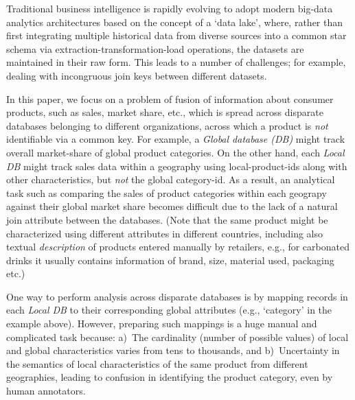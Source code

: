 Traditional business intelligence is rapidly evolving to adopt modern big-data analytics architectures based on the concept of a `data lake', where, rather than  first integrating multiple historical data from diverse sources into a common star schema via extraction-transformation-load operations, the datasets are maintained in their raw form. This leads to a number of challenges; for example, dealing with incongruous join keys between different datasets. 

In this paper, we focus on a problem of fusion of information about consumer products, such as sales, market share, etc., which is spread across disparate databases belonging to different organizations, across which a product is \textit{not} identifiable via a common key. For example, a \textit{Global database (DB)}
might track overall market-share of global product categories. On the other hand, each \textit{Local DB} might track sales data within a geography 
using local-product-ids along with other characteristics, but \textit{not} the global category-id. As a result, an analytical task such as comparing the
sales of product categories within each geograpy against their global market share becomes difficult due to the lack of a natural join attribute between the databases.
(Note that the same product might be characterized using different attributes in different countries, including also textual \textit{description} of products entered manually by retailers, e.g., for carbonated drinks it usually contains information of brand, size, material used, packaging etc.) 


One way to perform analysis across disparate databases is by mapping records in each \textit{Local DB} to their corresponding global attributes (e.g., `category'
in the example above). However, preparing such mappings is a huge manual and complicated task because: a)~The cardinality (number of possible values) of local and global characteristics varies from tens to thousands, and b)~Uncertainty in the semantics of local characteristics of the same product from different geographies, leading to confusion in identifying the product category, even by human annotators.
 
